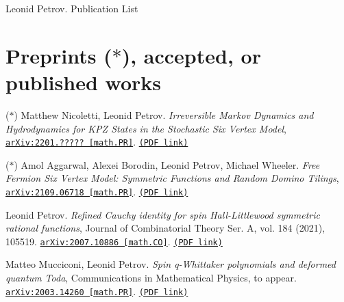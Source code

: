 \documentclass[letterpaper,11pt]{article}
\begin{document}
{\huge Leonid Petrov. Publication List}


\bigskip
\bigskip

\section*{Preprints ($*$), accepted, or published works}

\begin{etaremune}
\renewcommand{\labelenumi}{[\theenumi]}


\item ($*$)
Matthew Nicoletti, Leonid Petrov.
\emph{Irreversible Markov Dynamics and Hydrodynamics for KPZ States in the Stochastic Six Vertex Model}, 
\href{https://arxiv.org/abs/2201.?????}{\texttt{arXiv:2201.????? [math.PR]}}. \href{https://storage.lpetrov.cc/research_files/Petrov-publ/39-6v.pdf}{\texttt{(PDF link)}}









\item ($*$)
Amol Aggarwal, Alexei Borodin, Leonid Petrov, Michael Wheeler.
\emph{Free Fermion Six Vertex Model: Symmetric Functions and Random Domino Tilings}, 
\href{https://arxiv.org/abs/2109.06718}{\texttt{arXiv:2109.06718 [math.PR]}}. \href{https://storage.lpetrov.cc/research_files/Petrov-publ/38-sl11.pdf}{\texttt{(PDF link)}}

















\item 
Leonid Petrov.
\emph{Refined Cauchy identity for spin Hall-Littlewood symmetric rational functions}, Journal of Combinatorial Theory Ser. A, vol. 184 (2021), 105519. 
\href{https://arxiv.org/abs/2007.10886}{\texttt{arXiv:2007.10886 [math.CO]}}. \href{https://storage.lpetrov.cc/research_files/Petrov-publ/37-publ-petrov-uva.pdf}{\texttt{(PDF link)}}







\item 
Matteo Mucciconi, Leonid Petrov.
\emph{Spin q-Whittaker polynomials and deformed quantum Toda}, Communications in Mathematical Physics, to appear. 
\href{https://arxiv.org/abs/2003.14260}{\texttt{arXiv:2003.14260 [math.PR]}}. \href{https://storage.lpetrov.cc/research_files/Petrov-publ/36-publ-petrov-uva.pdf}{\texttt{(PDF link)}}










\end{etaremune}
\end{document}

